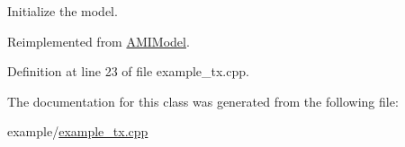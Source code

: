 Initialize the model. 



Reimplemented from \hyperlink{class_a_m_i_model_a8f45652e216686d0efa8db7e9dc0e915}{A\+M\+I\+Model}.



Definition at line 23 of file example\+\_\+tx.\+cpp.



The documentation for this class was generated from the following file\+:\begin{DoxyCompactItemize}
\item 
example/\hyperlink{example__tx_8cpp}{example\+\_\+tx.\+cpp}\end{DoxyCompactItemize}
